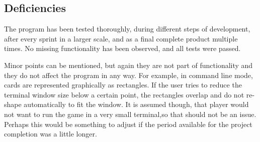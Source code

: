 \newpage
\subsection{Deficiencies}

The program has been tested thoroughly, during different steps of development, after every sprint in a larger scale, and as a final complete product multiple times. No missing functionality has been observed, and all tests were passed. 

Minor points can be mentioned, but again they are not part of functionality and they do not affect the program in any way. For example, in command line mode, cards are represented graphically as rectangles. If the user tries to reduce the terminal window size below a certain point, the rectangles overlap and do not re-shape automatically to fit the window. It is assumed though, that player would not want to run the game in a very small terminal,so that should not be an issue. Perhaps this would be something to adjust if the period available for the project completion was a little longer.
